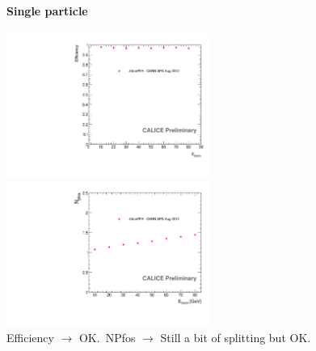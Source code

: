 \documentclass[8pt]{beamer}
\begin{document}
  \begin{frame}
  \frametitle{\secname}
  \framesubtitle{Single particle}
    \begin{center}
      \includegraphics[width=0.5\textwidth]{plots/SingleParticle_Efficiency.pdf}
      \includegraphics[width=0.5\textwidth]{plots/SingleParticle_NPfos.pdf} \\
      Efficiency $\rightarrow$ OK. NPfos $\rightarrow$ Still a bit of splitting but OK.
    \end{center}
  \end{frame}
  
\end{document}
